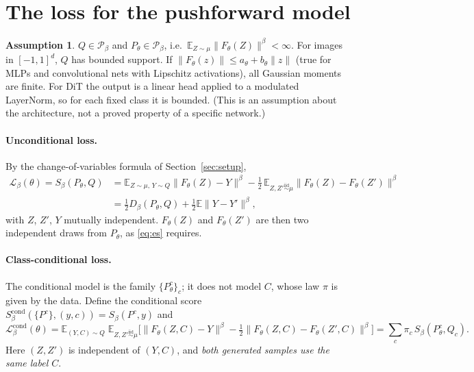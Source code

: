 \documentclass[11pt]{article}
\theoremstyle{definition}
\newtheorem{assumption}[theorem]{Assumption}
\theoremstyle{remark}
\newcommand{\E}{\mathbb{E}}
\newcommand{\Pb}{\mathcal{P}}
\newcommand{\norm}[1]{\lVert #1\rVert}
\newcommand{\Sb}{S_\beta}
\newcommand{\Db}{D_\beta}
\begin{document}
\section{The loss for the pushforward model}\label{sec:loss}
\begin{assumption}\label{ass:moments}
$Q\in\Pb_\beta$ and $P_\theta\in\Pb_\beta$, i.e.\ $\E_{Z\sim\mu}\norm{F_\theta(Z)}^\beta<\infty$.
For images in $[-1,1]^d$, $Q$ has bounded support. If $\norm{F_\theta(z)}\le a_\theta+b_\theta\norm{z}$ (true
for MLPs and convolutional nets with Lipschitz activations), all Gaussian moments are finite. For DiT the output
is a linear head applied to a modulated LayerNorm, so for each fixed class it is bounded.
(This is an assumption about the architecture, not a proved property of a specific network.)
\end{assumption}

\paragraph{Unconditional loss.} By the change-of-variables formula of Section~\ref{sec:setup},
\begin{equation}\label{eq:loss}
\begin{aligned}
\mathcal L_\beta(\theta)=\Sb(P_\theta,Q)&=\E_{Z\sim\mu,\,Y\sim Q}\norm{F_\theta(Z)-Y}^\beta
-\tfrac12\,\E_{Z,Z'\overset{\text{iid}}{\sim}\mu}\norm{F_\theta(Z)-F_\theta(Z')}^\beta\\
&=\tfrac12\Db(P_\theta,Q)+\tfrac12\E\norm{Y-Y'}^\beta,
\end{aligned}
\end{equation}
with $Z$, $Z'$, $Y$ mutually independent. $F_\theta(Z)$ and $F_\theta(Z')$ are then two independent draws
from $P_\theta$, as \eqref{eq:es} requires.

\paragraph{Class-conditional loss.} The conditional model is the family $\{P^c_\theta\}_{c}$; it does not
model $C$, whose law $\pi$ is given by the data. Define the conditional score
$S^{\mathrm{cond}}_\beta(\{P^c\},(y,c))=\Sb(P^c,y)$ and
\begin{equation}\label{eq:losscond}
\mathcal L^{\mathrm{cond}}_\beta(\theta)=\E_{(Y,C)\sim Q}\;\E_{Z,Z'\overset{\text{iid}}{\sim}\mu}\Big[\norm{F_\theta(Z,C)-Y}^\beta-\tfrac12\norm{F_\theta(Z,C)-F_\theta(Z',C)}^\beta\Big]
=\sum_{c}\pi_c\,\Sb(P^c_\theta,Q_c).
\end{equation}
Here $(Z,Z')$ is independent of $(Y,C)$, and \emph{both generated samples use the same label $C$}.
\end{document}
